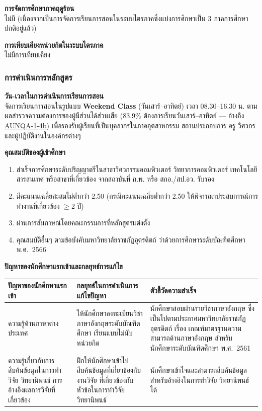 \textbf{การจัดการศึกษาภาคฤดูร้อน}\\
ไม่มี (เนื่องจากเป็นการจัดการเรียนการสอนในระบบไตรภาคซึ่งแบ่งการศึกษาเป็น 3 ภาคการศึกษาปกติอยู่แล้ว)

\textbf{การเทียบเคียงหน่วยกิตในระบบไตรภาค}\\
ไม่มีการเทียบเคียง

\subsubsection*{การดำเนินการหลักสูตร}

\textbf{วัน-เวลาในการดำเนินการเรียนการสอน}\\
จัดการเรียนการสอนในรูปแบบ \textbf{Weekend Class} (วันเสาร์--อาทิตย์) เวลา 08.30--16.30 น. ตามผลสำรวจความต้องการของผู้มีส่วนได้ส่วนเสีย (83.9\% ต้องการเรียนวันเสาร์--อาทิตย์ --- อ้างอิง \hyperlink{ref:AUNQA-1-4b}{AUNQA-1-4b}) เพื่อรองรับผู้เรียนที่เป็นบุคลากรในภาคอุตสาหกรรม สถานประกอบการ ครู วิศวกร และผู้ปฏิบัติงานในองค์กรต่างๆ

\textbf{คุณสมบัติของผู้เข้าศึกษา}

\begin{enumerate}
  \item สำเร็จการศึกษาระดับปริญญาตรีในสาขาวิศวกรรมคอมพิวเตอร์ วิทยาการคอมพิวเตอร์ เทคโนโลยีสารสนเทศ หรือสาขาที่เกี่ยวข้อง จากสถาบันที่ ก.พ. หรือ สกอ./สป.อว. รับรอง
  \item มีคะแนนเฉลี่ยสะสมไม่ต่ำกว่า 2.50 (กรณีคะแนนเฉลี่ยต่ำกว่า 2.50 ให้พิจารณาประสบการณ์การทำงานที่เกี่ยวข้อง $\geq$2 ปี)
  \item ผ่านการสัมภาษณ์โดยคณะกรรมการที่หลักสูตรแต่งตั้ง
  \item คุณสมบัติอื่นๆ ตามข้อบังคับมหาวิทยาลัยราชภัฏอุตรดิตถ์ ว่าด้วยการศึกษาระดับบัณฑิตศึกษา พ.ศ.~2566
\end{enumerate}

\textbf{ปัญหาของนักศึกษาแรกเข้าและกลยุทธ์การแก้ไข}

\begingroup
\footnotesize
\setlength{\tabcolsep}{4pt}
\renewcommand{\arraystretch}{1.3}
\begin{tabularx}{\linewidth}{|>{\raggedright\arraybackslash}p{4cm}|>{\raggedright\arraybackslash}X|>{\raggedright\arraybackslash}X|}
  \hline
  \rowcolor{gray!15}
  \textbf{ปัญหาของนักศึกษาแรกเข้า} & \textbf{กลยุทธ์ในการดำเนินการแก้ไขปัญหา} & \textbf{ตัวชี้วัดความสำเร็จ} \\
  \hline
  ความรู้ด้านภาษาต่างประเทศ & ให้นักศึกษาลงทะเบียนวิชาภาษาอังกฤษระดับบัณฑิตศึกษา เรียนแบบไม่นับหน่วยกิต & นักศึกษาสอบผ่านรายวิชาภาษาอังกฤษ ซึ่งเป็นไปตามประกาศมหาวิทยาลัยราชภัฏอุตรดิตถ์ เรื่อง เกณฑ์มาตรฐานความสามารถด้านภาษาอังกฤษ สำหรับนักศึกษาระดับบัณฑิตศึกษา พ.ศ.~2561 \\
  \hline
  ความรู้เกี่ยวกับการสืบค้นข้อมูลในการทำวิจัย วิทยานิพนธ์ การอ้างอิงผลการวิจัยที่เกี่ยวข้อง & ฝึกให้นักศึกษาเข้าไปสืบค้นข้อมูลที่เกี่ยวข้องกับงานวิจัย ที่เกี่ยวข้องกับหัวข้อในการทำวิจัย วิทยานิพนธ์ & นักศึกษาเข้าใจและสามารถสืบค้นข้อมูลสำหรับอ้างอิงในการทำวิจัย วิทยานิพนธ์ได้ \\
  \hline
\end{tabularx}
\endgroup

